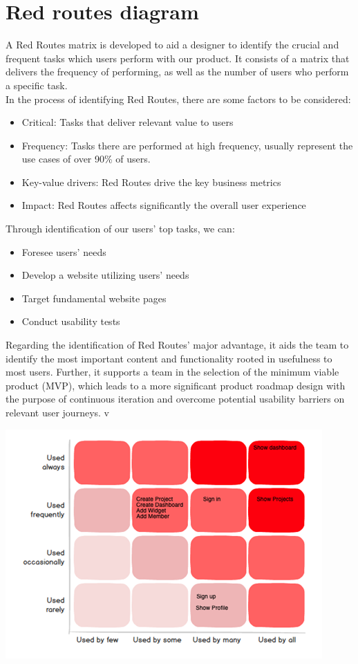 \documentclass[a4paper,twoside,10pt]{report}
\begin{document}
\section{Red routes diagram}
A  Red Routes matrix is developed to aid a designer to identify the crucial and frequent tasks which users perform with our product. It consists of a matrix that delivers the frequency of performing,  as well as the number of users who perform a specific task.
\\ \newline
In the process of identifying Red Routes, there are some factors to be considered:
\begin{itemize}
	\item  Critical: Tasks that deliver relevant value to users
 	\item Frequency: Tasks there are performed at high frequency, usually represent the use cases of over 90\% of users.
 	\item Key-value drivers: Red Routes drive the key business metrics
 	\item  Impact: Red Routes affects significantly the overall user experience
\end{itemize}
Through identification of our users' top tasks, we can:
\begin{itemize}
	\item Foresee users' needs
	\item Develop a website utilizing users' needs
	\item Target fundamental website pages
	\item Conduct usability tests
\end{itemize}	
Regarding the identification of Red Routes' major advantage, it aids the team to identify the most important content and functionality rooted in usefulness to most users.  Further, it supports a team in the selection of the minimum viable product (MVP), which leads to a more significant product roadmap design with the purpose of continuous iteration and overcome potential usability barriers on relevant user journeys. 
 v
\begin{center}
    \includegraphics[width=\textwidth]{red-routes-diagram.png}
\end{center}
\newpage
\end{document}
